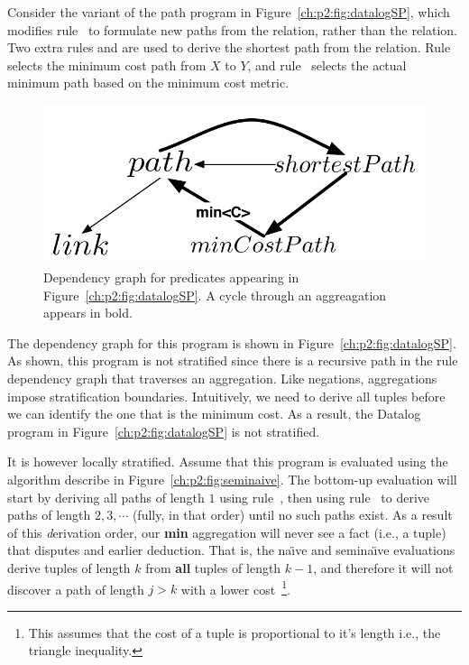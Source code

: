 Consider the variant of the path program in Figure~\ref{ch:p2:fig:datalogSP},
which modifies rule~ to formulate new paths from the  
relation, rather than the  relation.  Two extra rules  and  are used to
derive the shortest path from the  relation.  Rule~ selects the
minimum cost path from $X$ to $Y$, and rule~ selects the actual minimum
path based on the minimum cost metric.

\begin{figure} 
\ssp
\begin{center}
\includegraphics[scale=1]{figures/dependency-graph2}
\caption{\label{ch:p2:fig:dependency2}Dependency graph for predicates 
appearing in Figure~\ref{ch:p2:fig:datalogSP}. A cycle through an aggreagation
appears in bold. }
\end{center} 
\end{figure}

The dependency graph for this program is shown in
Figure~\ref{ch:p2:fig:datalogSP}.  As shown, this program is not stratified
since there is a recursive path in the rule dependency graph that traverses an
aggregation.  Like negations, aggregations impose stratification boundaries.
Intuitively, we need to derive all  tuples before we can identify the
one that is the minimum cost.  As a result, the Datalog program in
Figure~\ref{ch:p2:fig:datalogSP} is not stratified.

It is however locally stratified.  Assume that this program is evaluated using
the algorithm describe in Figure~\ref{ch:p2:fig:seminaive}.  The bottom-up
evaluation will start by deriving all paths of length $1$ using rule~,
then using rule~ to derive paths of length $2, 3, \cdots$ (fully, in
that order) until no such paths exist.  As a result of this {\emph derivation}
order, our {\bf min} aggregation will never see a fact (i.e., a 
tuple) that disputes and earlier deduction.  That is, the na\"{\i}ve and
semina\"{\i}ve evaluations derive  tuples of length $k$ from {\bf all}
 tuples of length $k-1$, and therefore it will not discover a path of
length $j > k$ with a lower cost~\footnote{This assumes that the cost of a
 tuple is proportional to it's length i.e., the triangle inequality.}.


